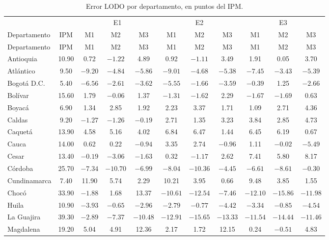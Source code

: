 \setlength{\tabcolsep}{2pt}
\footnotesize
\begin{longtable}{l c c c c c c c c c c}
\caption{Error LODO por departamento, en puntos del IPM.}
\label{tab:errores-lodo-dep}\\
\hline
 & & \multicolumn{3}{c}{E1} & \multicolumn{3}{c}{E2} & \multicolumn{3}{c}{E3} \\
Departamento & IPM & M1 & M2 & M3 & M1 & M2 & M3 & M1 & M2 & M3 \\
\hline
\endfirsthead
\hline
Departamento & IPM & M1 & M2 & M3 & M1 & M2 & M3 & M1 & M2 & M3 \\
\hline
\endhead
\hline
\endfoot
Antioquia & 10.90 & 0.72 & $-1.22$ & 4.89 & 0.92 & $-1.11$ & 3.49 & 1.91 & 0.05 & 3.70 \\
Atlántico & 9.50 & $-9.20$ & $-4.84$ & $-5.86$ & $-9.01$ & $-4.68$ & $-5.38$ & $-7.45$ & $-3.43$ & $-5.39$ \\
Bogotá D.C. & 5.40 & $-6.56$ & $-2.61$ & $-3.62$ & $-5.55$ & $-1.66$ & $-3.59$ & $-0.39$ & 1.25 & $-2.66$ \\
Bolívar & 15.60 & 1.79 & $-0.06$ & 1.37 & $-1.31$ & $-1.62$ & 2.29 & $-1.67$ & $-1.69$ & 0.63 \\
Boyacá & 6.90 & 1.34 & 2.85 & 1.92 & 2.23 & 3.37 & 1.71 & 1.09 & 2.71 & 4.36 \\
Caldas & 9.20 & $-1.27$ & $-1.26$ & $-0.19$ & 2.71 & 1.35 & 3.23 & 3.84 & 2.85 & 4.73 \\
Caquetá & 13.90 & 4.58 & 5.16 & 4.02 & 6.84 & 6.47 & 1.44 & 6.45 & 6.19 & 0.67 \\
Cauca & 14.00 & 0.62 & 0.22 & $-0.94$ & 3.35 & 2.74 & $-0.96$ & 1.11 & $-0.02$ & $-5.49$ \\
Cesar & 13.40 & $-0.19$ & $-3.06$ & $-1.63$ & 0.32 & $-1.17$ & 2.62 & 7.41 & 5.80 & 8.17 \\
Córdoba & 25.70 & $-7.34$ & $-10.70$ & $-6.99$ & $-8.04$ & $-10.36$ & $-4.45$ & $-6.61$ & $-8.61$ & $-0.30$ \\
Cundinamarca & 7.40 & 11.90 & 5.74 & 2.29 & 10.21 & 3.95 & 0.66 & 9.48 & 3.85 & 1.55 \\
Chocó & 33.90 & $-1.88$ & 1.68 & 13.37 & $-10.61$ & $-12.54$ & $-7.46$ & $-12.10$ & $-15.86$ & $-11.98$ \\
Huila & 10.90 & $-3.93$ & $-0.65$ & $-2.96$ & $-2.79$ & $-0.77$ & $-4.42$ & $-3.34$ & $-0.85$ & $-4.54$ \\
La Guajira & 39.30 & $-2.89$ & $-7.37$ & $-10.48$ & $-12.91$ & $-15.65$ & $-13.33$ & $-11.54$ & $-14.44$ & $-11.46$ \\
Magdalena & 19.20 & 5.04 & 4.91 & 12.36 & 2.17 & 1.72 & 12.15 & 0.24 & $-0.51$ & 4.83 \\

\end{longtable}
